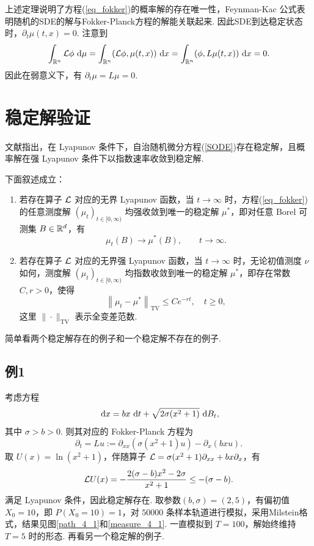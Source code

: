 上述定理说明了方程(\ref{eq_fokker})的概率解的存在唯一性，Feynman-Kac 公式表明随机的SDE的解与Fokker-Planck方程的解能关联起来. 因此SDE到达稳定状态时，$\partial_t\mu(t,x) = 0$. 注意到
\[
\int_{\mathbb{R}^n} \mathcal{L} \phi \text{ d} \mu = \int_{\mathbb{R}^n} (\mathcal{L} \phi, \mu(t,x)) \text{ d} x= 
\int _{\mathbb{R}^n} (\phi,L\mu(t,x)) \text{ d} x = 0.
\]
因此在弱意义下，有 $\partial_t \mu = L\mu = 0$. 















\section{稳定解验证}


文献\cite{Fokker_Planck}指出，在 Lyapunov 条件下，自治随机微分方程(\ref{SODE})存在稳定解，且概率解在强 Lyapunov 条件下以指数速率收敛到稳定解. 
\begin{theorem}
	下面叙述成立：
	\begin{enumerate}
		\item
			若存在算子 $\mathcal{L}$ 对应的无界 Lyapunov 函数，当 $t\to\infty$ 时，方程(\ref{eq_fokker})的任意测度解 $(\mu_t)_{t\in[0,\infty)}$ 均强收敛到唯一的稳定解 $\mu^*$，即对任意 Borel 可测集 $B \in \mathbb{R}^d$，有
			 \[
			 \mu_t(B) \to \mu^*(B),\qquad t\to \infty.
			 \]
		\item
			若存在算子 $\mathcal{L}$ 对应的无界强 Lyapunov 函数，当 $t\to\infty$ 时，无论初值测度 $\nu$ 如何，测度解 $(\mu_t)_{t\in[0,\infty)}$  均指数收敛到唯一的稳定解 $\mu^*$，即存在常数 $C,r > 0$，使得
			\[
			\left\|\mu_{t}-\mu^{*}\right\|_{\operatorname{TV}} \leq C e^{-r t}, \quad t \geq 0,
			\]
			这里 $\|\cdot\|_{\operatorname{TV}} $ 表示全变差范数. 
	\end{enumerate}
\end{theorem}



简单看两个稳定解存在的例子和一个稳定解不存在的例子.

\subsection*{例1}
考虑方程
\[
\text{ d} x = bx \text{ d} t + \sqrt{2\sigma(x^2+1)} \text{ d} B_t,
\]
其中 $\sigma > b > 0$. 则其对应的 Fokker-Planck 方程为
\[
\partial_t = Lu := \partial_{xx} (\sigma(x^2+1)u) - \partial_x (bxu).
\]
取 $U(x) = \ln(x^2+1)$，伴随算子 $\mathcal{L} = \sigma(x^2+1)\partial_{xx} + bx\partial_x$，有
\[
\mathcal{L} U(x) = -\frac{2(\sigma-b) x^{2}-2 \sigma}{x^{2}+1} \le -(\sigma-b).
\]
满足 Lyapunov 条件，因此稳定解存在. 取参数$(b,\sigma)=(2,5)$，有偏初值 $X_0=10$，即 $P(X_0 = 10) = 1$，对 $50000$ 条样本轨道进行模拟，采用Milstein格式，结果见图\ref{path_4_1}和\ref{measure_4_1}.
一直模拟到 $T=100$，解始终维持 $T=5$ 时的形态. 再看另一个稳定解的例子. 

